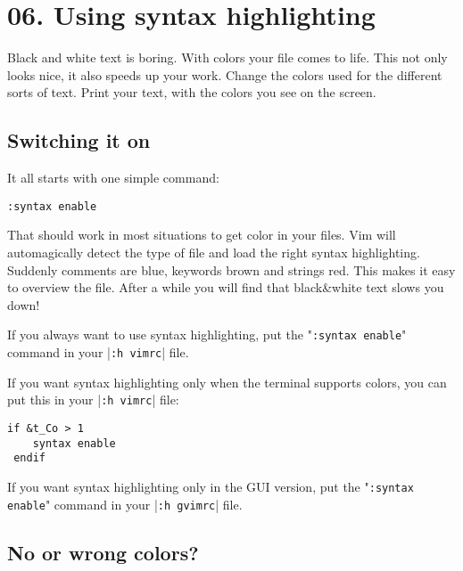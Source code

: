 \section{06. Using syntax highlighting}
\label{Using syntax highlighting}
Black and white text is boring.  With colors your file comes to life.  This
not only looks nice, it also speeds up your work.  Change the colors used for
the different sorts of text.  Print your text, with the colors you see on the
screen.
\subsection{Switching it on}

It all starts with one simple command:

 \begin{Verbatim}[samepage=true]
 :syntax enable
 \end{Verbatim}

That should work in most situations to get color in your files.
Vim will automagically detect the type of file and load the right syntax highlighting.
Suddenly comments are blue, keywords brown and strings red.
This makes it easy to overview the file.
After a while you will find that black\&white text slows you down!

If you always want to use syntax highlighting, put the "\texttt{:syntax enable}" command in your |\texttt{:h vimrc}| file.

If you want syntax highlighting only when the terminal supports colors, you can put this in your |\texttt{:h vimrc}| file:

 \begin{Verbatim}[samepage=true]
 if &t_Co > 1
    syntax enable
 endif
 \end{Verbatim}

If you want syntax highlighting only in the GUI version, put the "\texttt{:syntax enable}" command in your |\texttt{:h gvimrc}| file.

\subsection{No or wrong colors?}
\label{No or wrong colors?}

